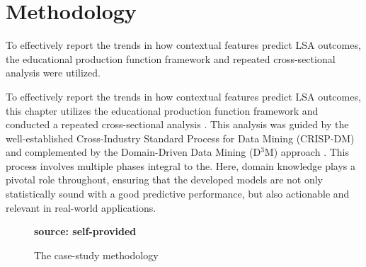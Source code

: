 \section{Methodology}

To effectively report the trends in how contextual features predict LSA outcomes, the educational production function framework \cite{bowles1970towards} and repeated cross-sectional analysis \cite{Buck1995ChoosingIssues} were utilized.


To effectively report the trends in how contextual features predict LSA outcomes, this chapter utilizes the educational production function framework \cite{bowles1970towards} and conducted a repeated cross-sectional analysis \cite{Buck1995ChoosingIssues}. This analysis was guided by the well-established Cross-Industry Standard Process for Data Mining (CRISP-DM) \cite{chapman1999cross}and complemented by the Domain-Driven Data Mining (D$^3$M) approach \cite{Cao2005DomainMethodology, Cao2009IntroductionMining}. This process involves multiple phases integral to the. Here, domain knowledge plays a pivotal role throughout, ensuring that the developed models are not only statistically sound with a good predictive performance, but also actionable and relevant in real-world applications.

\begin{figure}[ht!]
\centering
\caption{\textmd{The case-study methodology}}
\label{fig:process}
\par\medskip\ABNTEXfontereduzida\selectfont\textbf{source: self-provided} \par\medskip
\end{figure}

